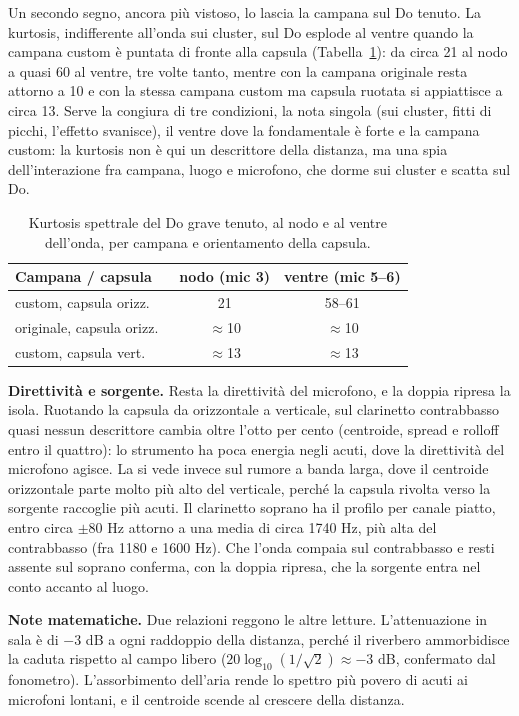 \documentclass{article}
\begin{document}
Un secondo segno, ancora più vistoso, lo lascia la campana sul Do tenuto. La kurtosis, indifferente all'onda sui cluster, sul Do esplode al ventre quando la campana custom è puntata di fronte alla capsula (Tabella~\ref{tab:kurtosis}): da circa 21 al nodo a quasi 60 al ventre, tre volte tanto, mentre con la campana originale resta attorno a 10 e con la stessa campana custom ma capsula ruotata si appiattisce a circa 13. Serve la congiura di tre condizioni, la nota singola (sui cluster, fitti di picchi, l'effetto svanisce), il ventre dove la fondamentale è forte e la campana custom: la kurtosis non è qui un descrittore della distanza, ma una spia dell'interazione fra campana, luogo e microfono, che dorme sui cluster e scatta sul Do.

\begin{table}[tbp]
\centering
\small
\begin{tabular}{@{}lcc@{}}
\toprule
Campana / capsula & nodo (mic 3) & ventre (mic 5--6) \\
\midrule
custom, capsula orizz.\ & 21 & 58--61 \\
originale, capsula orizz.\        & $\approx$10 & $\approx$10 \\
custom, capsula vert.\  & $\approx$13 & $\approx$13 \\
\bottomrule
\end{tabular}
\caption{Kurtosis spettrale del Do grave tenuto, al nodo e al ventre dell'onda, per campana e orientamento della capsula.}
\label{tab:kurtosis}
\end{table}

\medskip\noindent\textbf{Direttività e sorgente.}\quad
Resta la direttività del microfono, e la doppia ripresa la isola. Ruotando la capsula da orizzontale a verticale, sul clarinetto contrabbasso quasi nessun descrittore cambia oltre l'otto per cento (centroide, spread e rolloff entro il quattro): lo strumento ha poca energia negli acuti, dove la direttività del microfono agisce. La si vede invece sul rumore a banda larga, dove il centroide orizzontale parte molto più alto del verticale, perché la capsula rivolta verso la sorgente raccoglie più acuti. Il clarinetto soprano ha il profilo per canale piatto, entro circa $\pm 80$ Hz attorno a una media di circa 1740 Hz, più alta del contrabbasso (fra 1180 e 1600 Hz). Che l'onda compaia sul contrabbasso e resti assente sul soprano conferma, con la doppia ripresa, che la sorgente entra nel conto accanto al luogo.

\medskip\noindent\textbf{Note matematiche.}\quad
Due relazioni reggono le altre letture. L'attenuazione in sala è di $-3$ dB a ogni raddoppio della distanza, perché il riverbero ammorbidisce la caduta rispetto al campo libero ($20\log_{10}(1/\sqrt{2})\approx-3$ dB, confermato dal fonometro). L'assorbimento dell'aria rende lo spettro più povero di acuti ai microfoni lontani, e il centroide scende al crescere della distanza.
\end{document}
